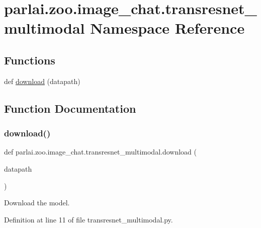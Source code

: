 \hypertarget{namespaceparlai_1_1zoo_1_1image__chat_1_1transresnet__multimodal}{}\section{parlai.\+zoo.\+image\+\_\+chat.\+transresnet\+\_\+multimodal Namespace Reference}
\label{namespaceparlai_1_1zoo_1_1image__chat_1_1transresnet__multimodal}
\subsection*{Functions}
\begin{DoxyCompactItemize}
\item 
def \hyperlink{namespaceparlai_1_1zoo_1_1image__chat_1_1transresnet__multimodal_a07b4f0a9e7658b5b5599d6d71bc08f2a}{download} (datapath)
\end{DoxyCompactItemize}


\subsection{Function Documentation}
\mbox{\label{namespaceparlai_1_1zoo_1_1image__chat_1_1transresnet__multimodal_a07b4f0a9e7658b5b5599d6d71bc08f2a}} 
\subsubsection{\texorpdfstring{download()}{download()}}
{\footnotesize\ttfamily def parlai.\+zoo.\+image\+\_\+chat.\+transresnet\+\_\+multimodal.\+download (\begin{DoxyParamCaption}\item[{}]{datapath }\end{DoxyParamCaption})}

\begin{DoxyVerb}Download the model.\end{DoxyVerb}
 

Definition at line 11 of file transresnet\+\_\+multimodal.\+py.



